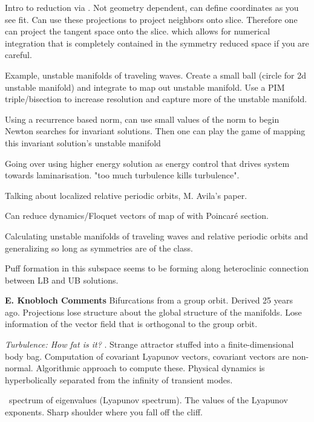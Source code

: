 \begin{description}
{\begin{description}
Intro to  reduction via {\fFslice}. Not geometry dependent, can define
coordinates as you see fit. Can use these projections to project neighbors onto slice.
Therefore one can project the tangent space onto the slice. which allows
for numerical integration that is completely contained in the symmetry
reduced space if you are careful.

Example, unstable manifolds of traveling waves. Create a small ball (circle for 2d unstable
manifold) and integrate to map out unstable manifold. Use a PIM triple/bisection to increase resolution
and capture more of the unstable manifold.

Using a recurrence based norm, can use small values of the norm to begin Newton searches for
invariant solutions. Then one can play the game of mapping this invariant solution's unstable manifold

Going over using higher energy solution as energy control that drives system towards laminarisation.
"too much turbulence kills turbulence".

Talking about localized relative periodic orbits, M. Avila's paper.

Can reduce dynamics/Floquet vectors of map of {\fFslice} with Poincar\'e section.

Calculating unstable manifolds of traveling waves and relative periodic orbits and generalizing
so long as symmetries are of the  class.

Puff formation in this subspace seems to be forming along heteroclinic connection between LB and UB
solutions.

\textbf{E. Knobloch Comments}
Bifurcations from a group orbit. Derived 25 years ago. Projections lose structure about the global structure of the
manifolds. Lose information of the vector field that is orthogonal to the group orbit.

\item[P. Cvitanovi\'c]
\textit{Turbulence: How fat is it?} %
.
Strange attractor stuffed into a finite-dimensional body bag.
Computation of covariant Lyapunov vectors, covariant vectors are non-normal.
Algorithmic approach to compute these.
Physical dynamics is hyperbolically separated from the infinity of transient modes.

\KSe\ spectrum of eigenvalues (Lyapunov spectrum). The values of the Lyapunov exponents.
Sharp shoulder where you fall off the cliff.


\end{description}}
\end{description}
